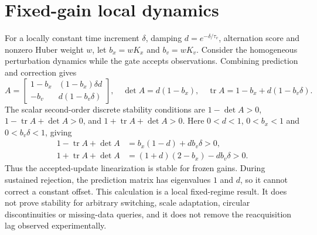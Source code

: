 \documentclass[12pt,a4paper]{article}
\begin{document}
\section{Fixed-gain local dynamics}
For a locally constant time increment $\delta$, damping $d=e^{-\delta/\tau_v}$, alternation score and nonzero Huber weight $w$, let $b_x=wK_x$ and $b_v=wK_v$. Consider the homogeneous perturbation dynamics while the gate accepts observations. Combining prediction and correction gives
\begin{equation}
 A=\begin{bmatrix}1-b_x&(1-b_x)\delta d\\-b_v&d(1-b_v\delta)\end{bmatrix},\quad
 \det A=d(1-b_x),\quad \operatorname{tr}A=1-b_x+d(1-b_v\delta).
\end{equation}
The scalar second-order discrete stability conditions are $1-\det A>0$, $1-\operatorname{tr}A+\det A>0$, and $1+\operatorname{tr}A+\det A>0$. Here $0<d<1$, $0<b_x<1$ and $0<b_v\delta<1$, giving
\begin{align}
 1-\operatorname{tr}A+\det A&=b_x(1-d)+db_v\delta>0,\\
 1+\operatorname{tr}A+\det A&=(1+d)(2-b_x)-db_v\delta>0.
\end{align}
Thus the accepted-update linearization is stable for frozen gains. During sustained rejection, the prediction matrix has eigenvalues $1$ and $d$, so it cannot correct a constant offset. This calculation is a local fixed-regime result. It does not prove stability for arbitrary switching, scale adaptation, circular discontinuities or missing-data queries, and it does not remove the reacquisition lag observed experimentally.
\end{document}
